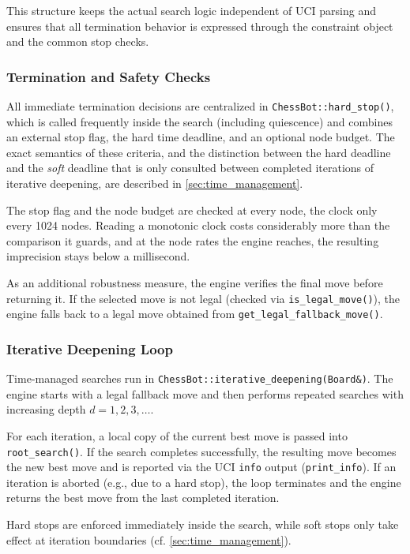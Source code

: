 This structure keeps the actual search logic independent of UCI parsing and
ensures that all termination behavior is expressed through the constraint object
and the common stop checks.

\subsubsection{Termination and Safety Checks}

All immediate termination decisions are centralized in
\texttt{ChessBot::hard\_stop()}, which is called frequently inside the search
(including quiescence) and combines an external stop flag, the hard time
deadline, and an optional node budget. The exact semantics of these criteria,
and the distinction between the hard deadline and the \emph{soft} deadline that
is only consulted between completed iterations of iterative deepening, are
described in \cref{sec:time_management}.

The stop flag and the node budget are checked at every node, the clock only every
1024 nodes. Reading a monotonic clock costs considerably more than the comparison
it guards, and at the node rates the engine reaches, the resulting imprecision
stays below a millisecond.

As an additional robustness measure, the engine verifies the final move before
returning it. If the selected move is not legal (checked via
\texttt{is\_legal\_move()}), the engine falls back to a legal move
obtained from \texttt{get\_legal\_\allowbreak fallback\_move()}.

\subsubsection{Iterative Deepening Loop}

Time-managed searches run in \texttt{ChessBot::\allowbreak iterative\_deepening(Board\&)}.
The engine starts with a legal fallback move and then performs repeated searches
with increasing depth $d = 1,2,3,\dots$.

For each iteration, a local copy of the current best move is passed into
\texttt{root\_search()}. If the search completes successfully, the resulting move
becomes the new best move and is reported via the UCI \texttt{info} output
(\texttt{print\_info}). If an iteration is aborted (e.g., due to a hard stop),
the loop terminates and the engine returns the best move from the last completed
iteration.

Hard stops are enforced immediately inside the search, while soft stops only
take effect at iteration boundaries (cf. \cref{sec:time_management}).

